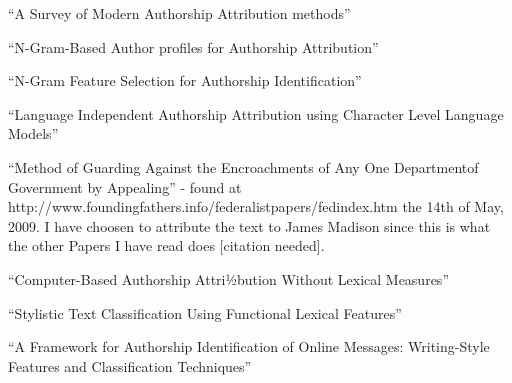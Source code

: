 \begin{thebibliography}{100}

 ``A Survey of Modern Authorship Attribution methods''

 ``N-Gram-Based Author profiles for Authorship Attribution''

 ``N-Gram Feature Selection for Authorship Identification''

 ``Language Independent Authorship Attribution using Character Level Language Models''

 ``Method of Guarding Against the Encroachments of Any One Departmentof Government by Appealing'' - found at http://www.foundingfathers.info/federalistpapers/fedindex.htm the 14th of May, 2009. I have choosen to attribute the text to James Madison since this is what the other Papers I have read does [citation needed].

 ``Computer-Based Authorship Attri½bution Without Lexical Measures''

 ``Stylistic Text Classification Using Functional Lexical Features''

 ``A Framework for Authorship Identification of Online Messages: Writing-Style Features and Classification Techniques''
\end{thebibliography}
